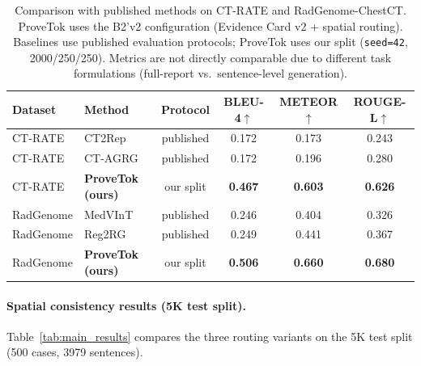 \documentclass[11pt,a4paper]{article}
\begin{document}
\begin{table}[H]
\centering\small
\caption{Comparison with published methods on CT-RATE and RadGenome-ChestCT.
ProveTok uses the B2'v2 configuration (Evidence Card v2 + spatial routing).
Baselines use published evaluation protocols; ProveTok uses our split (\texttt{seed=42}, 2000/250/250).
Metrics are not directly comparable due to different task formulations (full-report vs.\ sentence-level generation).}
\label{tab:main_nlg}
\begin{tabular}{@{}llc ccc@{}}
\toprule
\textbf{Dataset} & \textbf{Method} & \textbf{Protocol}
  & \textbf{BLEU-4}$\uparrow$ & \textbf{METEOR}$\uparrow$ & \textbf{ROUGE-L}$\uparrow$ \\
\midrule
CT-RATE & CT2Rep      & published & 0.172 & 0.173 & 0.243 \\
CT-RATE & CT-AGRG     & published & 0.172 & 0.196 & 0.280 \\
CT-RATE & \textbf{ProveTok (ours)} & our split & \textbf{0.467} & \textbf{0.603} & \textbf{0.626} \\
\midrule
RadGenome & MedVInT   & published & 0.246 & 0.404 & 0.326 \\
RadGenome & Reg2RG    & published & 0.249 & 0.441 & 0.367 \\
RadGenome & \textbf{ProveTok (ours)} & our split & \textbf{0.506} & \textbf{0.660} & \textbf{0.680} \\
\bottomrule
\end{tabular}
\end{table}

\paragraph{Spatial consistency results (5K test split).}
Table~\ref{tab:main_results} compares the three routing variants on the 5K test split (500 cases, 3979 sentences).
\end{document}
